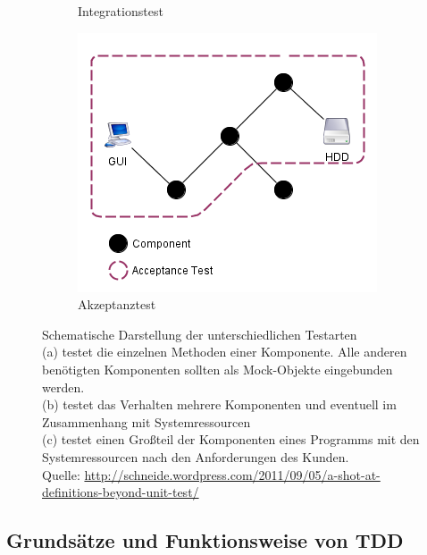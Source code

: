 \begin{figure}[h]
\begin{subfigure}[b]{0.29\textwidth}
	\caption{Integrationstest}
	\label{fig:Integration_Test}
	\end{subfigure}
	\begin{subfigure}[b]{0.39\textwidth}
	\centering
	\captionsetup{justification=centering}
	\includegraphics[width=\textwidth]{./images/Kapitel_Einleitung/Akzeptanz_Test.png}
	\caption{Akzeptanztest}
	\label{fig:Acceptance_Test}
	\end{subfigure}
\caption[Schematische Darstellung der unterschiedlichen Testarten]{Schematische Darstellung der unterschiedlichen Testarten\\(a) testet die einzelnen Methoden einer Komponente. Alle anderen benötigten Komponenten sollten als Mock-Objekte eingebunden werden.\\(b) testet das Verhalten mehrere Komponenten und eventuell im Zusammenhang mit Systemressourcen\\(c) testet einen Großteil der Komponenten eines Programms mit den Systemressourcen nach den Anforderungen des Kunden.\\
Quelle: \url{http://schneide.wordpress.com/2011/09/05/a-shot-at-definitions-beyond-unit-test/}}
\label{fig:UnitIntegrationAcceptanceTest_Comparison}
\end{figure}
\clearpage

\subsection{Grundsätze und Funktionsweise von TDD}

